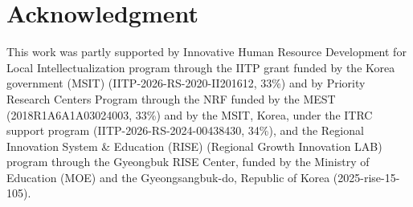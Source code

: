 \documentclass[5p,times,twocolumn]{elsarticle}
\begin{document}
\section*{Acknowledgment}

This work was partly supported by Innovative Human Resource Development for Local Intellectualization program through the IITP grant funded by the Korea government (MSIT) (IITP-2026-RS-2020-II201612, 33\%) and by Priority Research Centers Program through the NRF funded by the MEST (2018R1A6A1A03024003, 33\%) and by the MSIT, Korea, under the ITRC support program (IITP-2026-RS-2024-00438430, 34\%),  and the Regional Innovation System \& Education (RISE) (Regional Growth Innovation LAB) program through the Gyeongbuk RISE Center, funded by the Ministry of Education (MOE) and the Gyeongsangbuk-do, Republic of Korea (2025-rise-15-105).

\small

\vspace{-0.3cm}

\vspace{-0.3cm}
\end{document}
